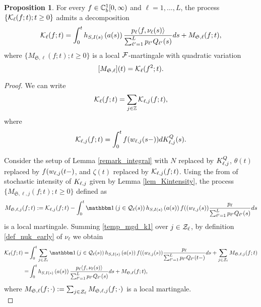 \documentclass{article}
\theoremstyle{definition}
\newtheorem{proposition}[theorem]{Proposition}
\numberwithin{equation}{section}
\begin{document}
\begin{proposition}\label{prop_Kdecomp}
  For every $f\in\mathbb{C}_b^{1}[0,\infty)$ and $\ell=1,...,L$, the process $\{\mathcal{K}_\ell(f;t);t\geq0\}$ admits a decomposition
  \begin{equation}\label{Kdcomp}
    \mathcal{K}_\ell(f;t)= \int_0^t h_{S,I(s)}\left(a(s)\right) \frac{p_\ell \langle f,\nu_\ell(s)\rangle }{\sum_{\ell'=1}^Lp_{\ell'}Q_{\ell'}(s)} ds +M_{\mathfrak{S},\ell}(f;t),
  \end{equation}
  where $\{M_{\mathfrak{S},\ell}(f;t);t\geq0\}$ is a local $\mathcal{F}$-martingale with quadratic variation $$[M_{\mathfrak{S},\ell}](t)=\mathcal{K}_\ell(f^2;t).$$
\end{proposition}

\begin{proof}
  We can write
\begin{equation}\label{def_Kl_decomp}
\mathcal{K}_\ell(f;t)=\sum_{j\in\mathbb{Z}} \mathcal{K}_{\ell,j}(f;t),
\end{equation}
where
\begin{equation}\label{def_KClj}
\mathcal{K}_{\ell,j}(f;t)= \int_0^tf(w_{\ell,j}(s-))dK^Q_{\ell,j}(s).
\end{equation}


Consider the setup of Lemma \ref{remark_integral} with $N$ replaced by $K^Q_{\ell,j}$,  $\theta(t)$ replaced by $f(w_{\ell,j}(t-)$, and $\zeta(t)$ replaced by $\mathcal{K}_{\ell,j}(f;t)$. Using the from of stochastic intensity of $K_{\ell,j}$ given by Lemma \ref{lem_Kintensity}, the process $\{M_{\mathfrak{S},\ell,j}(f;t);t\geq0\}$ defined as
\begin{equation}\label{temp_mgd_k1}
M_{\mathfrak{S},\ell,j}(f;t) := \entryC_{\ell,j}(f;t) - \int_0^t \indic{j\in\inque_\ell(s)} h_{S,\class(s)}\left(\age(s)\right) f((\waiting_{\ell,j}(s)) \frac{\weight_\ell}{\sum_{\ell'=1}^L\weight_{\ell'}\ql_{\ell'}(s)}ds
\end{equation}
is a local martingale. Summing \eqref{temp_mgd_k1} over $j\in\mathcal{Z}_\ell$, by definition \eqref{def_nuk_early} of $\nu_\ell$ we obtain
\begin{align*}
  \entryC_\ell(f;t) = &  \int_0^t \sum_{j\in\indexSet_\ell}\indic{j\in\inque_\ell(s)} h_{S,\class(s)}\left(\age(s)\right) f((\waiting_{\ell,j}(s)) \frac{\weight_\ell}{\sum_{\ell'=1}^L\weight_{\ell'}\ql_{\ell'}(t-)}ds+ \sum_{j\in\indexSet_\ell}M_{\mathfrak{S},\ell,j}(f;t)\\
   = & \int_0^t h_{S,\class(s)}\left(\age(s)\right) \frac{\weight_\ell \langle f,\nu_\ell(s)\rangle }{\sum_{\ell'=1}^L\weight_{\ell'}\ql_{\ell'}(s)} ds + M_{\mathfrak{S},\ell}(f;t),
\end{align*}
where $M_{\mathfrak{S},\ell} (f;\cdot):= \sum_{j\in \mathcal{Z}_\ell}M_{\mathfrak{S},\ell,j}(f;\cdot)$ is a local martingale.\\


\end{proof}
\end{document}
